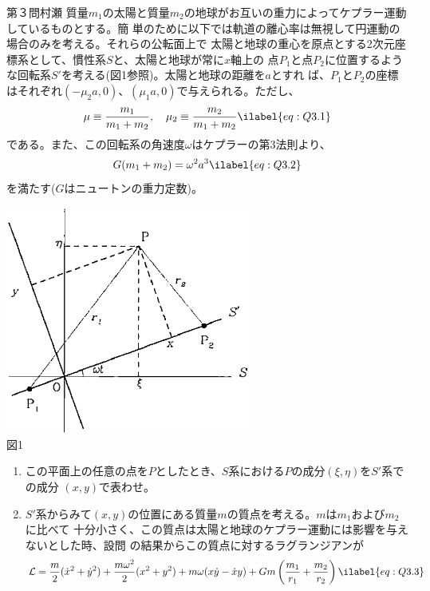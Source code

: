 \begin{question}{第３問}{村瀬}
質量$m_1$の太陽と質量$m_2$の地球がお互いの重力によってケプラー運動しているものとする。簡
単のために以下では軌道の離心率は無視して円運動の場合のみを考える。それらの公転面上で
太陽と地球の重心を原点とする2次元座標系として、慣性系$S$と、太陽と地球が常に$x$軸上の
点$P_1$と点$P_2$に位置するような回転系$S'$を考える(図1参照)。太陽と地球の距離を$a$とすれ
ば、$P_1$と$P_2$の座標はそれぞれ$(-\mu_2a,0)$、$(\mu_1a,0)$で与えられる。ただし、
\begin{align}
  \mu\equiv\frac{m_1}{m_1+m_2},\quad
  \mu_2\equiv\frac{m_2}{m_1+m_2} \ilabel{eq:Q3.1}
\end{align}
である。また、この回転系の角速度$\omega$はケプラーの第3法則より、
\begin{align}
  G(m_1+m_2)=\omega^2a^3 \ilabel{eq:Q3.2}
\end{align}
を満たす($G$はニュートンの重力定数)。
\begin{center}
  \includegraphics[width=0.6\textwidth]{2006physQ3_1r.eps}\\図1
\end{center}
\begin{enumerate}
\item{}
  この平面上の任意の点を$P$としたとき、$S$系における$P$の成分$(\xi,\eta)$を$S'$系での成分
  $(x,y)$で表わせ。
\item
  $S'$系からみて$(x,y)$の位置にある質量$m$の質点を考える。$m$は$m_1$および$m_2$に比べて
  十分小さく、この質点は太陽と地球のケプラー運動には影響を与えないとした時、設問
  の結果からこの質点に対するラグランジアンが
  \begin{align}
    \mathcal{L}=\frac m2(\dot x^2 + \dot y^2)
    + \frac{m\omega^2}2 (x^2+y^2) + m\omega(x\dot y-\dot x y)
    + Gm\left(\frac{m_1}{r_1}+\frac{m_2}{r_2}\right) \ilabel{eq:Q3.3}

\end{align}
\end{enumerate}
\end{question}

